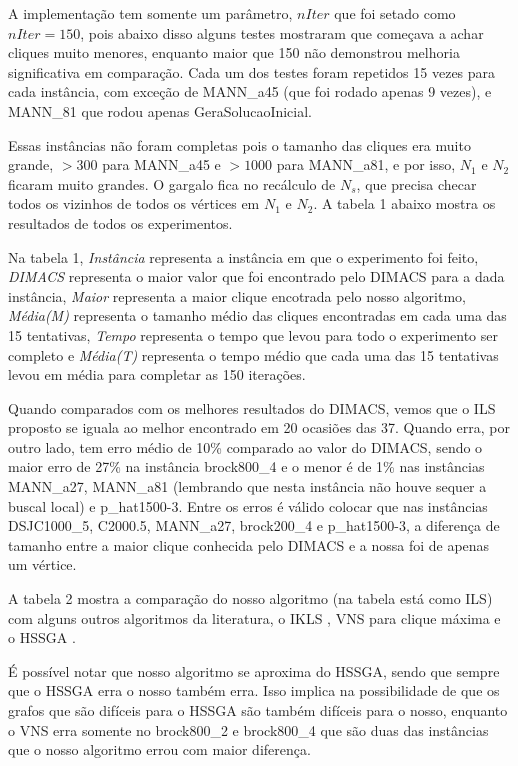 \documentclass{article}
\begin{document}
A implementação tem somente um parâmetro, $nIter$ que foi setado como $nIter = 150$, pois abaixo disso alguns testes mostraram que começava a achar cliques muito menores, enquanto maior que 150 não demonstrou melhoria significativa em comparação. Cada um dos testes foram repetidos 15 vezes para cada instância, com exceção de MANN\_a45 (que foi rodado apenas 9 vezes), e MANN\_81 que rodou apenas GeraSolucaoInicial. \par

Essas instâncias não foram completas pois o tamanho das cliques era muito grande, $> 300$ para MANN\_a45  e $>1000$ para MANN\_a81, e por isso, $N_1$ e $N_2$ ficaram muito grandes. O gargalo fica no recálculo de $N_s$, que precisa checar todos os vizinhos de todos os vértices em $N_1$ e $N_2$. A tabela 1 abaixo mostra os resultados de todos os experimentos.\par

Na tabela 1, \textit{Instância} representa a instância em que o experimento foi feito, \textit{DIMACS} representa o maior valor que foi encontrado pelo DIMACS \cite{DIMACS2} para a dada instância, \textit{Maior} representa a maior clique encotrada pelo nosso algoritmo, \textit{Média(M)} representa o tamanho médio das cliques encontradas em cada uma das 15 tentativas, \textit{Tempo} representa o tempo que levou para todo o experimento ser completo e \textit{Média(T)} representa o tempo médio que cada uma das 15 tentativas levou em média para completar as 150 iterações.\par

Quando comparados com os melhores resultados do DIMACS, vemos que o ILS proposto se iguala ao melhor encontrado em 20 ocasiões das 37. Quando erra, por outro lado, tem erro médio de 10\% comparado ao valor do DIMACS, sendo o maior erro de 27\% na instância brock800\_4 e o menor é de 1\% nas instâncias MANN\_a27, MANN\_a81 (lembrando que nesta instância não houve sequer a buscal local) e p\_hat1500-3. Entre os erros é válido colocar que nas instâncias DSJC1000\_5, C2000.5, MANN\_a27, brock200\_4 e p\_hat1500-3, a diferença de tamanho entre a maior clique conhecida pelo DIMACS e a nossa foi de apenas um vértice.\par

A tabela 2 mostra a comparação do nosso algoritmo (na tabela está como ILS) com alguns outros algoritmos da literatura, o IKLS \cite{kopt}, VNS para clique máxima \cite{vns} e o HSSGA \cite{HSSGA}.\par

É possível notar que nosso algoritmo se aproxima do HSSGA, sendo que sempre que o HSSGA erra o nosso também erra. Isso implica na possibilidade de que os grafos que são difíceis para o HSSGA são também difíceis para o nosso, enquanto o VNS erra somente  no brock800\_2 e brock800\_4 que são duas das instâncias que o nosso algoritmo errou com maior diferença. 
\end{document}
